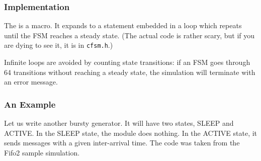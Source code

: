 \subsubsection{Implementation}


The  is a macro. It expands to a 
statement embedded in a  loop which repeats until the
FSM reaches a steady state. (The actual code is rather
scary, but if you are dying to see it, it is in \texttt{cfsm.h}.)

Infinite loops are avoided by counting state transitions: if
an FSM goes through 64 transitions without reaching a steady
state, the simulation will terminate with an error message.


\subsubsection{An Example}


Let us write another bursty generator. It will have two
states, SLEEP and ACTIVE. In the SLEEP state, the module does
nothing. In the ACTIVE state, it sends messages with a given
inter-arrival time. The code was taken from the Fifo2 sample
simulation.


